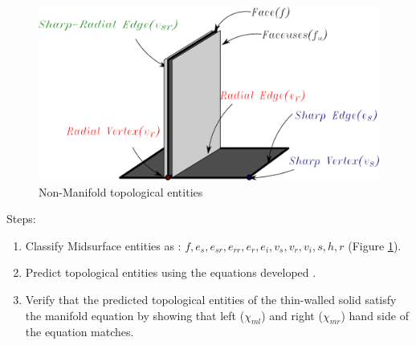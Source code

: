 \begin{figure}[h]
\centering 

\includegraphics[width=0.6\linewidth]{../Common/images/NonManifoldT1.pdf}
\caption{Non-Manifold topological entities}
\label{fig_nonmanifold}
\end{figure}
Steps:
\begin{enumerate}[noitemsep,topsep=2pt,parsep=2pt,partopsep=2pt]
\item Classify Midsurface entities  as : $f, e_s , e_{sr} , e_{rr}, e_r , e_i, v_s , v_r , v_i, s , h , r$ (Figure \ref{fig_nonmanifold}).
\item Predict topological entities using the equations developed \cite{YogeshCADandA2015}.%
\item Verify that the predicted topological entities of the  thin-walled solid satisfy the manifold equation by showing that left ($\chi_{ml}$) and right  ($\chi_{mr}$) hand side of the equation matches. %
\end{enumerate}


